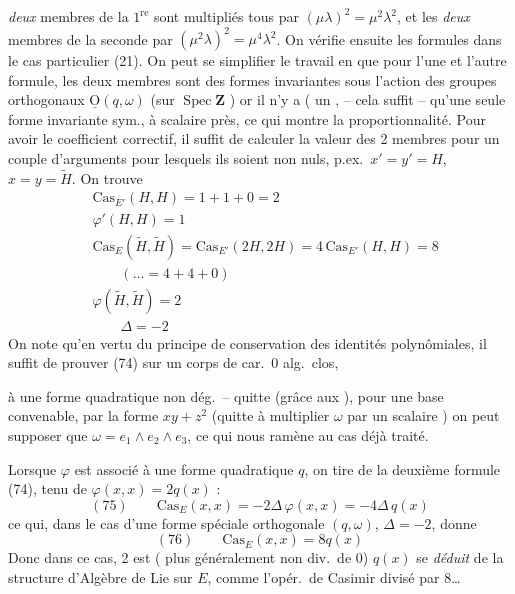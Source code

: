 \documentclass[11pt,a4paper]{article}
\begin{document}
\emph{deux} membres de la $1^{\mathrm{re}}$ sont multipliés tous par
$(\mu\lambda)^2 = \mu^2\lambda^2$, et les \emph{deux} membres de la seconde
par $(\mu^2\lambda)^2 = \mu^4\lambda^2$. On vérifie ensuite les formules
dans le cas particulier (21). On peut se simplifier le travail en
 que pour l'une et l'autre formule, les deux membres sont
des formes invariantes sous l'action des groupes  orthogonaux
$\underline{\mathrm{O}}(q, \omega)$ (sur $\operatorname{Spec} \mathbf{Z}$
) or il n'y a ( un 
, \ill{} -- cela suffit -- qu'une seule forme invariante
sym., à scalaire près, ce qui montre la proportionnalité. Pour avoir le
coefficient correctif, il suffit de calculer la valeur des 2 membres pour un
couple d'arguments pour lesquels ils soient non nuls, p.ex.\ $x' = y' = H$,
$x = y = \tilde{H}$. On trouve
\[
  \begin{aligned}
    &\mathrm{Cas}_{E'}(H, H) = 1 + 1 + 0 = 2 \\
    &\varphi'(H, H) = 1 \\
    &\mathrm{Cas}_{E}(\tilde{H}, \tilde{H}) = \mathrm{Cas}_{E'}(2H, 2H) = 4\, \mathrm{Cas}_{E'}(H, H) = 8 \\
    &\qquad (\ldots = 4 + 4 + 0) \\
    &\varphi(\tilde{H}, \tilde{H}) = 2 \\
    &\qquad \Delta = -2
  \end{aligned}
\]
On note qu'en vertu du  principe de conservation des
identités polynômiales, il suffit de prouver (74) sur un corps de car.\
0 alg.\ clos, 

à une forme quadratique non dég.\ -- quitte (grâce aux ), pour
une base convenable, \uncertain{multiplier} par \uncertain{$\lambda$} la forme
$xy + z^2$ (quitte à multiplier $\omega$ par un scalaire \uncertain{convenable}
\uncertain{inversible}) on peut supposer que $\omega = e_1 \wedge e_2 \wedge e_3$,
ce qui nous ramène au cas déjà traité.

Lorsque $\varphi$ est associé à une forme quadratique $q$, on tire de la
deuxième formule (74), \uncertain{compte} tenu de $\varphi(x, x) = 2q(x)$ :
\[
  (75) \qquad \mathrm{Cas}_E(x, x) = -2\Delta\, \varphi(x, x) = -4\Delta\, q(x)
\]
ce qui, dans le cas d'une forme  spéciale orthogonale
$(q, \omega)$, \uncertain{où} $\Delta = -2$, donne
\[
  (76) \qquad \mathrm{Cas}_E(x, x) = 8q(x)
\]
Donc dans ce cas, \struck{\ill{}}  2 est 
(\uncertain{ou} plus généralement non div.\ de 0) $q(x)$ se \emph{déduit} de
la structure d'Algèbre de Lie sur $E$, comme l'opér.\ de Casimir divisé par
8\ldots
\end{document}
